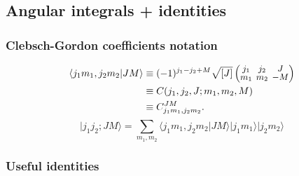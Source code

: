 \documentclass[10pt,twocolumn,a4paper]{article}%
\newcommand{\eqdiagram}[2]{\adjustbox{valign=c}{\texttt{[image: \#2]}}}
\newcommand{\ket}[1]{\ensuremath{|#1\rangle}}	%
\newcommand{\braket}[1]{\ensuremath{\langle #1\rangle}}	%
\newcommand{\threej}[6]{
\renewcommand\arraystretch{0.75}\setlength\arraycolsep{2pt}
\small\ensuremath{\begin{pmatrix}#1&#2&#3\\#4&#5&#6\end{pmatrix}}
}	%
\newcommand{\be}{\begin{equation}}
\newcommand{\ee}{\end{equation}}
\begin{document}




\subsection{Angular integrals + identities}










\subsubsection*{Clebsch-Gordon coefficients notation}

\begin{align}
\braket{j_1 m_1,j_2m_2|JM} &\equiv (-1)^{j_1-j_2+M}\sqrt{[J]}\threej{j_1}{j_2}{J}{m_1}{m_2}{-M}\\
&\equiv C(j_1,j_2,J; m_1, m_2, M)\\
&\equiv C^{JM}_{j_1m_1,j_2m_2}.
\end{align}
\be
\ket{j_1 j_2;JM} =\sum_{m_1,m_2} \braket{j_1 m_1,j_2m_2|JM} \ket{j_1m_1}\ket{j_2m_2}
\ee


\subsubsection*{Useful identities}
\end{document}
